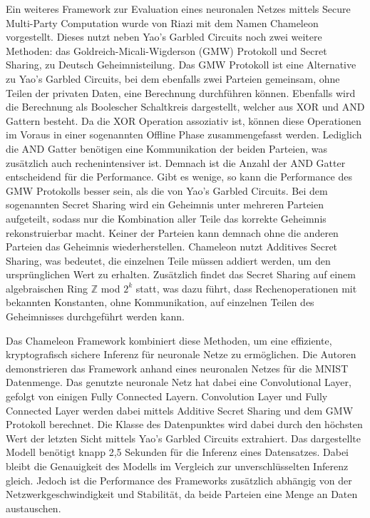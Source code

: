 Ein weiteres Framework zur Evaluation eines neuronalen Netzes mittels Secure Multi-Party Computation wurde von Riazi \etal \cite{P-72} mit dem Namen Chameleon vorgestellt.
Dieses nutzt neben Yao's Garbled Circuits noch zwei weitere Methoden: das Goldreich-Micali-Wigderson (GMW) Protokoll und Secret Sharing, zu Deutsch Geheimnisteilung.
Das GMW Protokoll ist eine Alternative zu Yao's Garbled Circuits, bei dem ebenfalls zwei Parteien gemeinsam, ohne Teilen der privaten Daten, eine Berechnung durchführen können.
Ebenfalls wird die Berechnung als Boolescher Schaltkreis dargestellt, welcher aus XOR und AND Gattern besteht. 
Da die XOR Operation assoziativ ist, können diese Operationen im Voraus in einer sogenannten Offline Phase zusammengefasst werden. 
Lediglich die AND Gatter benötigen eine Kommunikation der beiden Parteien, was zusätzlich auch rechenintensiver ist.
Demnach ist die Anzahl der AND Gatter entscheidend für die Performance.
Gibt es wenige, so kann die Performance des GMW Protokolls besser sein, als die von Yao's Garbled Circuits.
Bei dem sogenannten Secret Sharing wird ein Geheimnis unter mehreren Parteien aufgeteilt, sodass nur die Kombination aller Teile das korrekte Geheimnis rekonstruierbar macht.
Keiner der Parteien kann demnach ohne die anderen Parteien das Geheimnis wiederherstellen. 
Chameleon nutzt Additives Secret Sharing, was bedeutet, die einzelnen Teile müssen addiert werden, um den ursprünglichen Wert zu erhalten.
Zusätzlich findet das Secret Sharing auf einem algebraischen Ring $\mathbb{Z}$ mod $2^{k} $ statt, was dazu führt, dass Rechenoperationen mit bekannten Konstanten, ohne Kommunikation, auf einzelnen Teilen des Geheimnisses durchgeführt werden kann.


Das Chameleon Framework kombiniert diese Methoden, um eine effiziente, kryptografisch sichere Inferenz für neuronale Netze zu ermöglichen. 
Die Autoren demonstrieren das Framework anhand eines neuronalen Netzes für die MNIST Datenmenge.
Das genutzte neuronale Netz hat dabei eine Convolutional Layer, gefolgt von einigen Fully Connected Layern.
Convolution Layer und Fully Connected Layer werden dabei mittels Additive Secret Sharing und dem GMW Protokoll berechnet.
Die Klasse des Datenpunktes wird dabei durch den höchsten Wert der letzten Sicht mittels Yao's Garbled Circuits extrahiert.
Das dargestellte Modell benötigt knapp 2,5 Sekunden für die Inferenz eines Datensatzes.
Dabei bleibt die Genauigkeit des Modells im Vergleich zur unverschlüsselten Inferenz gleich.
Jedoch ist die Performance des Frameworks zusätzlich abhängig von der Netzwerkgeschwindigkeit und Stabilität, da beide Parteien eine Menge an Daten austauschen.

